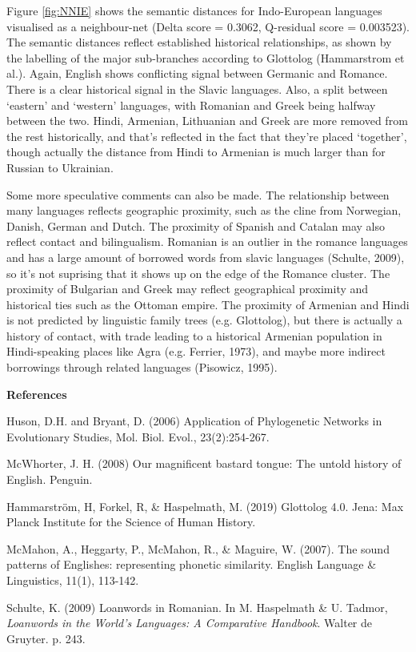 \documentclass[notitlepage]{report}
\begin{document}
Figure \ref{fig:NNIE} shows the semantic distances for Indo-European languages visualised as a neighbour-net (Delta score = 0.3062, Q-residual score = 0.003523). The semantic distances reflect established historical relationships, as shown by the labelling of the major sub-branches according to Glottolog (Hammarstrom et al.). Again, English shows conflicting signal between Germanic and Romance. There is a clear historical signal in the Slavic languages. Also, a split between `eastern' and `western' languages, with Romanian and Greek being halfway between the two.  Hindi, Armenian, Lithuanian and Greek are more removed from the rest historically, and that's reflected in the fact that they're placed `together', though actually the distance from Hindi to Armenian is much larger than for Russian to Ukrainian.

Some more speculative comments can also be made. The relationship between many languages reflects geographic proximity, such as the cline from Norwegian, Danish, German and Dutch. The proximity of Spanish and Catalan may also reflect contact and bilingualism. Romanian is an outlier in the romance languages and has a large amount of borrowed words from slavic languages (Schulte, 2009), so it's not suprising that it shows up on the edge of the Romance cluster. The proximity of Bulgarian and Greek may reflect geographical proximity and historical ties such as the Ottoman empire. The proximity of Armenian and Hindi is not predicted by linguistic family trees (e.g. Glottolog), but there is actually a history of contact, with trade leading to a historical Armenian population in Hindi-speaking places like Agra (e.g. Ferrier, 1973), and maybe more indirect borrowings through related languages (Pisowicz, 1995). 

\noindent
\textbf{References}

Huson, D.H. and Bryant, D. (2006) Application of Phylogenetic Networks in Evolutionary Studies, Mol. Biol. Evol., 23(2):254-267.

McWhorter, J. H. (2008) Our magnificent bastard tongue: The untold history of English. Penguin.

Hammarstr\"{o}m, H, Forkel, R, \& Haspelmath, M. (2019) Glottolog 4.0. Jena: Max Planck Institute for the Science of Human History.

McMahon, A., Heggarty, P., McMahon, R., \& Maguire, W. (2007). The sound patterns of Englishes: representing phonetic similarity. English Language \& Linguistics, 11(1), 113-142. 

Schulte, K. (2009) Loanwords in Romanian. In M. Haspelmath \& U. Tadmor, \emph{Loanwords in the World's Languages: A Comparative Handbook}. Walter de Gruyter. p. 243.
\end{document}
